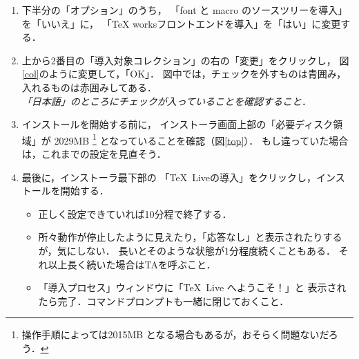 \documentclass{ltjsarticle}
\begin{document}
\begin{enumerate}
  まず，インストーラの一番上にある
  「{選択したスキーム}」の右の「変更」をクリックし，
  「{teTeXスキーム}」を選択
  \footnote{%
    ちなみに，\href{http://www.tug.org/tetex/}{te\TeX}というのは，
    Thomas Esser氏がメンテナンスをしていた，UNIX系OSのための\TeX システムである．
    以前は広く用いられてきたが，2006年に更新停止となった．
  }，「OK」．

\item 下半分の「オプション」のうち，
  「font と macro のソースツリーを導入」を「いいえ」に，
  「TeX worksフロントエンドを導入」を「はい」に変更する．

\item 上から2番目の「導入対象コレクション」の右の「変更」をクリックし，
  図\nobreak\ref{col}のように変更して，「OK」．
  図中では，チェックを外すものは青囲み，入れるものは赤囲みしてある．\\
  \emph{「日本語」のところにチェックが入っていることを確認すること．}

\item インストールを開始する前に，
インストーラ画面上部の「必要ディスク領域」が 2029MB
\footnote{操作手順によっては2015MB となる場合もあるが，おそらく問題ないだろう．}
となっていることを確認（図\nobreak\ref{top}）．
もし違っていた場合は，これまでの設定を見直そう．

\item 最後に，インストーラ最下部の
  「\TeX\ Liveの導入」をクリックし，インストールを開始する．
  \begin{itemize}
  \item 正しく設定できていれば10分程で終了する．
  \item 所々動作が停止したように見えたり，「応答なし」と表示されたりするが，気にしない．
    長いとそのような状態が1分程度続くこともある．
    それ以上長く続いた場合はTAを呼ぶこと．
  \item 「導入プロセス」ウィンドウに「\TeX\ Live へようこそ！」と
    表示されたら完了．コマンドプロンプトも一緒に閉じておくこと．
  \end{itemize}


\end{enumerate}
\end{document}
